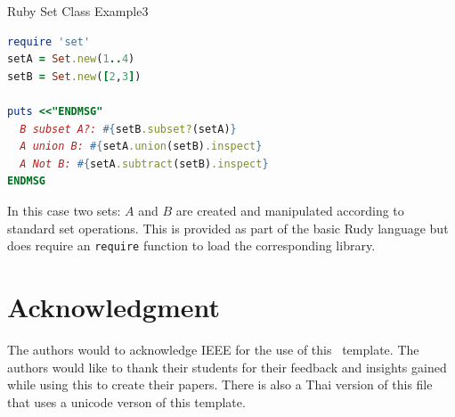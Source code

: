 \documentclass[journal,12pt]{IEEEtran}
\begin{document}
\begin{code}
\caption{Ruby Set Class Example3}
\label{RubySetClass}
\begin{lstlisting}[language=Ruby]
require 'set'
setA = Set.new(1..4)
setB = Set.new([2,3])

puts <<"ENDMSG"
  B subset A?: #{setB.subset?(setA)}
  A union B: #{setA.union(setB).inspect}
  A Not B: #{setA.subtract(setB).inspect}
ENDMSG
\end{lstlisting}
\end{code}

In this case two sets: $A$ and $B$ are created and manipulated according to standard set operations. This is provided as part of the basic Rudy language but does require an \verb|require| function to load the corresponding library.

\section*{Acknowledgment}

The authors would to acknowledge IEEE for the use of this \LaTeXe\ template. The authors would like to thank their students for their feedback and insights gained while using this to create their papers. There is also a Thai version of this file that uses a unicode verson of this template.


%

\par\vfill
\end{document}
